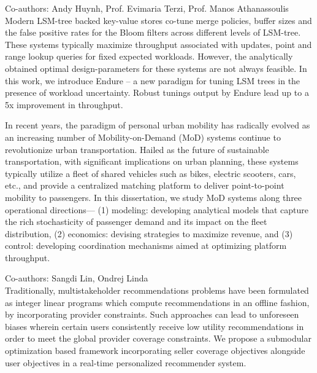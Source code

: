 \documentclass[10pt]{moderncv}
\begin{document}
{
    Co-authors: Andy Huynh, Prof. Evimaria Terzi, Prof. Manos Athanassoulis\\
    Modern LSM-tree backed key-value stores co-tune merge policies, buffer sizes and the false positive rates for the 
        Bloom filters across different levels of LSM-tree. 
    These systems typically maximize throughput associated with updates, point and range lookup queries for fixed 
        expected workloads. 
    However, the analytically obtained optimal design-parameters for these systems are not always feasible. 
    In this work, we introduce Endure -- a new paradigm for tuning LSM trees in the presence of workload uncertainty. 
    Robust tunings output by Endure lead up to a 5x improvement in throughput.
}

{
    In recent years, the paradigm of personal urban mobility has radically evolved as an increasing number of 
        Mobility-on-Demand (MoD) systems continue to revolutionize urban transportation. 
    Hailed as the future of sustainable transportation, with significant implications on urban planning, these systems 
        typically utilize a fleet of shared vehicles such as bikes, electric scooters, cars, etc., and provide a 
        centralized matching platform to deliver point-to-point mobility to passengers. 
    In this dissertation, we study MoD systems along three operational directions—
    (1) modeling: developing analytical models that capture the rich stochasticity of passenger demand and its impact 
        on the fleet distribution,
    (2) economics: devising strategies to maximize revenue, and 
    (3) control: developing coordination mechanisms aimed at optimizing platform throughput.
}

{
    Co-authors: Sangdi Lin, Ondrej Linda\\
    Traditionally, multistakeholder recommendations problems have been formulated as integer linear programs which 
        compute recommendations in an offline fashion, by incorporating provider constraints.
    Such approaches can lead to unforeseen biases wherein certain users consistently receive low utility 
        recommendations in order to meet the global provider coverage constraints. 
    We propose a submodular optimization based framework incorporating seller coverage objectives alongside user 
        objectives in a real-time personalized recommender system.
}
\end{document}
